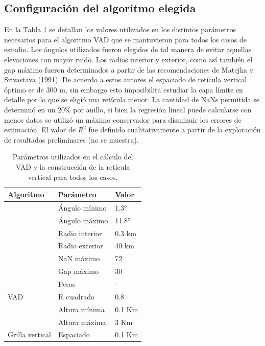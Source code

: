 \documentclass[12pt,spanish,oneside, a4paper]{book}
\begin{document}
\subsection{Configuración del algoritmo
elegida}\label{configuracion-del-algoritmo-elegida}

En la Tabla \ref{parametros} se detallan los valores utilizados en los
distintos parámetros necesarios para el algoritmo VAD que se mantuvieron
para todos los casos de estudio. Los ángulos utilizados fueron elegidos
de tal manera de evitar aquellas elevaciones con mayor ruido. Los radios
interior y exterior, como así también el gap máximo fueron determinados
a partir de las recomendaciones de Matejka y Srivastava (1991). De
acuerdo a estos autores el espaciado de retícula vertical óptimo es de
300 m, sin embargo esto imposibilita estudiar la capa límite en detalle
por lo que se eligió una retícula menor. La cantidad de NaNs permitida
se determinó en un 20\% por anillo, si bien la regresión lineal puede
calcularse con menos datos se utilizó un máximo conservador para
disminuir los errores de estimación. El valor de \(R^2\) fue definido
cualitativamente a partir de la exploración de resultados preliminares
(no se muestra).

\begin{table}

\caption{\label{tab:parametros}Parámetros utilizados en el cálculo del VAD y la construcción de la retícula vertical para todos los casos. \label{parametros}}
\centering
\begin{tabular}[t]{lll}
\toprule
Algoritmo & Parámetro & Valor\\
\midrule
 & Ángulo mínimo & 1.3°\\
\cmidrule{2-3}
 & Ángulo máximo & 11.8°\\
\cmidrule{2-3}
 & Radio interior & 0.3 km\\
\cmidrule{2-3}
 & Radio exterior & 40 km\\
\cmidrule{2-3}
 & NaN máximo & 72\\
\cmidrule{2-3}
 & Gap máximo & 30\\
\cmidrule{2-3}
 & Pesos & -\\
\cmidrule{2-3}
\multirow{-8}{*}{\raggedright\arraybackslash VAD} & R cuadrado & 0.8\\
\cmidrule{1-3}
 & Altura mínima & 0.1 Km\\
\cmidrule{2-3}
 & Altura máxima & 3 Km\\
\cmidrule{2-3}
\multirow{-3}{*}{\raggedright\arraybackslash Grilla vertical} & Espaciado & 0.1 Km\\
\bottomrule
\end{tabular}
\end{table}
\end{document}

